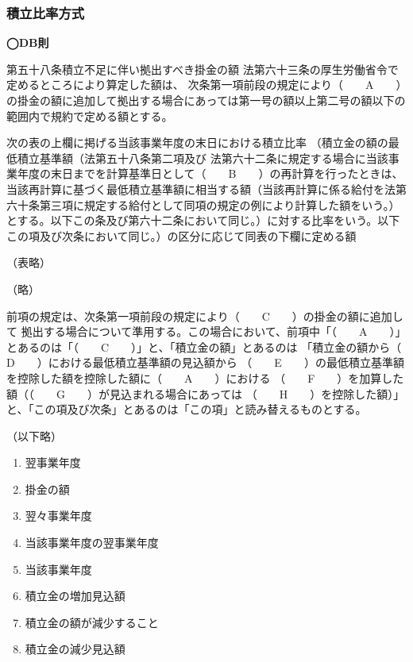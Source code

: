 \subsubsection{積立比率方式}

\begin{fillblank}[数理人試験 2019 問題1 設問2]
  \noindent \textbf{◯DB則}
  \begin{lawstructure}
    \begin{lawarticle}{第五十八条}{積立不足に伴い拠出すべき掛金の額}
      法第六十三条の厚生労働省令で定めるところにより算定した額は、
      次条第一項前段の規定により（　　A　　）の掛金の額に追加して拠出する場合にあっては第一号の額以上第二号の額以下の範囲内で規約で定める額とする。
    
      次の表の上欄に掲げる当該事業年度の末日における積立比率
      （積立金の額の最低積立基準額（法第五十八条第二項及び
      法第六十二条に規定する場合に当該事業年度の末日までを計算基準日として（　　B　　）の再計算を行ったときは、当該再計算に基づく最低積立基準額に相当する額（当該再計算に係る給付を法第六十条第三項に規定する給付として同項の規定の例により計算した額をいう。）とする。以下この条及び第六十二条において同じ。）に対する比率をいう。以下この項及び次条において同じ。）の区分に応じて同表の下欄に定める額

      （表略）

      （略）

      前項の規定は、次条第一項前段の規定により（　　C　　）の掛金の額に追加して
      拠出する場合について準用する。この場合において、前項中「（　　A　　）」
      とあるのは「（　　C　　）」と、「積立金の額」とあるのは
      「積立金の額から（　　D　　）における最低積立基準額の見込額から
      （　　E　　）の最低積立基準額を控除した額を控除した額に（　　A　　）における
      （　　F　　）を加算した額（（　　G　　）が見込まれる場合にあっては
      （　　H　　）を控除した額）」と、「この項及び次条」とあるのは「この項」と読み替えるものとする。
      
      （以下略）

    \end{lawarticle}
  \end{lawstructure}
\end{fillblank}


\begin{answerbox}
  \begin{enumerate}[A: ]
    \item 翌事業年度
    \item 掛金の額
    \item 翌々事業年度
    \item 当該事業年度の翌事業年度
    \item 当該事業年度
    \item 積立金の増加見込額
    \item 積立金の額が減少すること
    \item 積立金の減少見込額
  \end{enumerate}
\end{answerbox}

